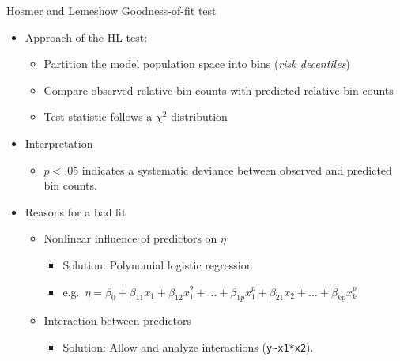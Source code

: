 \documentclass[
  ignorenonframetext,
]{beamer}
\providecommand{\tightlist}{%
  \setlength{\itemsep}{0pt}\setlength{\parskip}{0pt}}
\begin{document}
\begin{frame}[fragile]{Hosmer and Lemeshow Goodness-of-fit test}
\protect\hypertarget{hosmer-and-lemeshow-goodness-of-fit-test}{}

\begin{itemize}
\tightlist
\item
  Approach of the HL test:

  \begin{itemize}
  \tightlist
  \item
    Partition the model population space into bins (\emph{risk
    decentiles})
  \item
    Compare observed relative bin counts with predicted relative bin
    counts
  \item
    Test statistic follows a \(\chi^2\) distribution
  \end{itemize}
\item
  Interpretation

  \begin{itemize}
  \tightlist
  \item
    \(p<.05\) indicates a systematic deviance between observed and
    predicted bin counts.
  \end{itemize}
\item
  Reasons for a bad fit

  \begin{itemize}
  \tightlist
  \item
    Nonlinear influence of predictors on \(\eta\)

    \begin{itemize}
    \tightlist
    \item
      Solution: Polynomial logistic regression
    \item
      e.g.~\(\eta=\beta_0+\beta_{11}x_1+\beta_{12}x_1^2+\ldots+\beta_{1p}x_1^p+\beta_{21}x_2+\ldots+\beta_{kp}x_k^p\)
    \end{itemize}
  \item
    Interaction between predictors

    \begin{itemize}
    \tightlist
    \item
      Solution: Allow and analyze interactions
      (\texttt{y\textasciitilde{}x1*x2}).
    \end{itemize}
  \end{itemize}
\end{itemize}

\end{frame}
\end{document}
